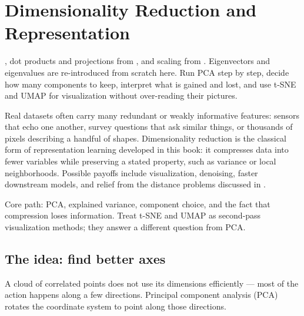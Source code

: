 \chapter{Dimensionality Reduction and Representation}
\label{ch:dimred}

\chapterguide%
  {, dot products and projections from , and scaling from . Eigenvectors and eigenvalues are re-introduced from scratch here.}
  {Run PCA step by step, decide how many components to keep, interpret what is gained and lost, and use t-SNE and UMAP for visualization without over-reading their pictures.}

Real datasets often carry many redundant or weakly informative features: sensors that echo one another, survey questions that ask similar things, or thousands of pixels describing a handful of shapes. Dimensionality reduction is the classical form of representation learning developed in this book: it compresses data into fewer variables while preserving a stated property, such as variance or local neighborhoods. Possible payoffs include visualization, denoising, faster downstream models, and relief from the distance problems discussed in .

\begin{firstread}
Core path: PCA, explained variance, component choice, and the fact that compression loses information. Treat t-SNE and UMAP as second-pass visualization methods; they answer a different question from PCA.
\end{firstread}

\section{The idea: find better axes}

A cloud of correlated points does not use its dimensions efficiently --- most of the action happens along a few directions. Principal component analysis (PCA) rotates the coordinate system to point along those directions.

\begin{mlfigure}
\end{mlfigure}

